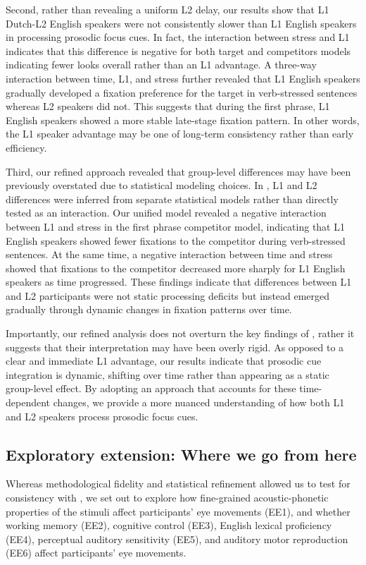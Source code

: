 Second, rather than revealing a uniform L2 delay, our results show that L1 Dutch-L2 English speakers were not consistently slower than L1 English speakers in processing prosodic focus cues. In fact, the interaction between stress and L1 indicates that this difference is negative for both target and competitors models indicating fewer looks overall rather than an L1 advantage. A three-way interaction between time, L1, and stress further revealed that L1 English speakers gradually developed a fixation preference for the target in verb-stressed sentences whereas L2 speakers did not. This suggests that during the first phrase, L1 English speakers showed a more stable late-stage fixation pattern. In other words, the L1 speaker advantage may be one of long-term consistency rather than early efficiency.

Third, our refined approach revealed that group-level differences may have been previously overstated due to statistical modeling choices. In \cite{ge2021a}, L1 and L2 differences were inferred from separate statistical models rather than directly tested as an interaction. Our unified model revealed a negative interaction between L1 and stress in the first phrase competitor model, indicating that L1 English speakers showed fewer fixations to the competitor during verb-stressed sentences. At the same time, a negative interaction between time and stress showed that fixations to the competitor decreased more sharply for L1 English speakers as time progressed. These findings indicate that differences between L1 and L2 participants were not static processing deficits but instead emerged gradually through dynamic changes in fixation patterns over time.

Importantly, our refined analysis does not overturn the key findings of \cite{ge2021a}, rather it suggests that their interpretation may have been overly rigid. As opposed to a clear and immediate L1 advantage, our results indicate that prosodic cue integration is dynamic, shifting over time rather than appearing as a static group-level effect. By adopting an approach that accounts for these time-dependent changes, we provide a more nuanced understanding of how both L1 and L2 speakers process prosodic focus cues.

\subsection{Exploratory extension: Where we go from here}

 Whereas methodological fidelity and statistical refinement allowed us to test for consistency with \cite{ge2021a}, we set out to explore how fine-grained acoustic-phonetic properties of the stimuli affect participants' eye movements (EE1), and whether working memory (EE2), cognitive control (EE3), English lexical proficiency (EE4), perceptual auditory sensitivity (EE5), and auditory motor reproduction (EE6) affect participants' eye movements.
 

